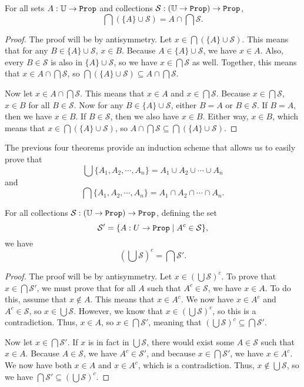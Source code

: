 \documentclass[../math.tex]{subfiles}
\begin{document}
\begin{theorem}
    For all sets $A : \U \rightarrow \Prop$ and collections $\mathcal S : (\U
    \rightarrow \Prop) \rightarrow \Prop$,
    \[
        \bigcap (\{A\} \cup \mathcal S) = A \cap \bigcap \mathcal S.
    \]
\end{theorem}
\begin{proof}
    The proof will be by antisymmetry.  Let $x \in \bigcap (\{A\} \cup \mathcal
    S)$.  This means that for any $B \in \{A\} \cup \mathcal S$, $x \in B$.
    Because $A \in \{A\} \cup \mathcal S$, we have $x \in A$.  Also, every $B
    \in \mathcal S$ is also in $\{A\} \cup \mathcal S$, so we have $x \in
    \bigcap \mathcal S$ as well.  Together, this means that $x \in A \cap
    \bigcap \mathcal S$, so $\bigcap (\{A\} \cup \mathcal S) \subseteq A \cap
    \bigcap \mathcal S$.

    Now let $x \in A \cap \bigcap \mathcal S$.  This means that $x \in A$ and $x
    \in \bigcap \mathcal S$.  Because $x \in \bigcap \mathcal S$, $x \in B$ for
    all $B \in \mathcal S$.  Now for any $B \in \{A\} \cup \mathcal S$, either
    $B = A$ or $B \in \mathcal S$.  If $B = A$, then we have $x \in B$.  If $B
    \in \mathcal S$, then we also have $x \in B$.  Either way, $x \in B$, which
    means that $x \in \bigcap (\{A\} \cup \mathcal S)$, so $A \cap \bigcap
    \mathcal S \subseteq \bigcap (\{A\} \cup \mathcal S)$.
\end{proof}

The previous four theorems provide an induction scheme that allows us to easily
prove that
\[
    \bigcup \{A_1, A_2, \cdots, A_n\} = A_1 \cup A_2 \cup \cdots \cup A_n
\]
and
\[
    \bigcap \{A_1, A_2, \cdots, A_n\} = A_1 \cap A_2 \cap \cdots \cap A_n.
\]

\begin{theorem}
    For all collections $\mathcal S : \col \U$, defining the set
    \[
        \mathcal S' = \{A : \set U \mid A^c \in \mathcal S\},
    \]
    we have
    \[
        \left( \bigcup \mathcal S \right)^c = \bigcap \mathcal S'.
    \]
\end{theorem}
\begin{proof}
    The proof will be by antisymmetry.  Let $x \in (\bigcup \mathcal S)^c$.  To
    prove that $x \in \bigcap \mathcal S'$, we must prove that for all $A$ such
    that $A^c \in \mathcal S$, we have $x \in A$.  To do this, assume that $x
    \notin A$.  This means that $x \in A^c$.  We now have $x \in A^c$ and $A^c
    \in \mathcal S$, so $x \in \bigcup \mathcal S$.  However, we know that $x
    \in (\bigcup \mathcal S)^c$, so this is a contradiction.  Thus, $x \in A$,
    so $x \in \bigcap \mathcal S'$, meaning that $(\bigcup \mathcal S)^c
    \subseteq \bigcap \mathcal S'$.

    Now let $x \in \bigcap \mathcal S'$.  If $x$ is in fact in $\bigcup \mathcal
    S$, there would exist some $A \in \mathcal S$ such that $x \in A$.  Because
    $A \in \mathcal S$, we have $A^c \in \mathcal S'$, and because $x \in
    \bigcap \mathcal S'$, we have $x \in A^c$.  We now have both $x \in A$ and
    $x \in A^c$, which is a contradiction.  Thus, $x \notin \bigcup \mathcal S$,
    so we have $\bigcap \mathcal S' \subseteq (\bigcup \mathcal S)^c$.
\end{proof}
\end{document}
